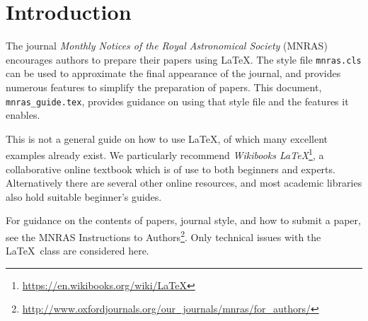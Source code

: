 
\section{Introduction}

The journal \textit{Monthly Notices of the Royal Astronomical Society} (MNRAS) encourages authors to prepare their papers using \LaTeX.
The style file \verb'mnras.cls' can be used to approximate the final appearance of the journal, and provides numerous features to simplify the preparation of papers.
This document, \verb'mnras_guide.tex', provides guidance on using that style file and the features it enables.

This is not a general guide on how to use \LaTeX, of which many excellent examples already exist.
We particularly recommend \textit{Wikibooks \LaTeX}\footnote{\url{https://en.wikibooks.org/wiki/LaTeX}}, a collaborative online textbook which is of use to both beginners and experts.
Alternatively there are several other online resources, and most academic libraries also hold suitable beginner's guides.

For guidance on the contents of papers, journal style, and how to submit a paper, see the MNRAS Instructions to Authors\footnote{\label{foot:itas}\url{http://www.oxfordjournals.org/our_journals/mnras/for_authors/}}.
Only technical issues with the \LaTeX\ class are considered here.
